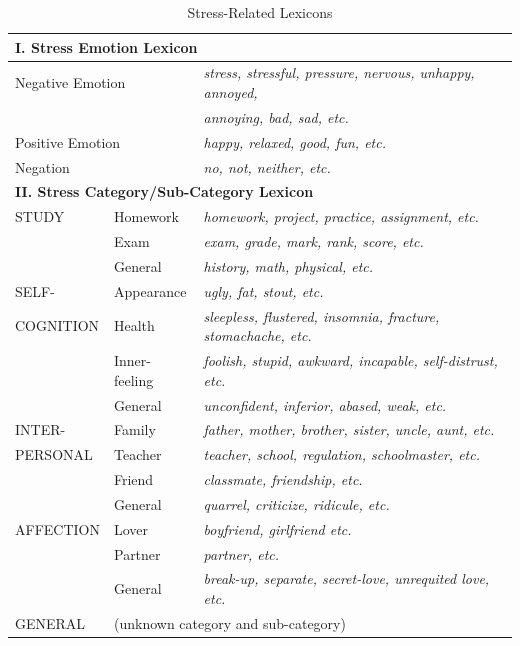 \begin{table}
\label{tab:lexicons}
\begin{minipage}{\textwidth}
\centering
\caption{Stress-Related Lexicons}

\begin{tabular}{ll|l} \\ \hline
\multicolumn{3}{l}{\textbf{I. Stress Emotion Lexicon}} \\ \hline
\multicolumn{2}{l|}{Negative Emotion} & \emph{stress, stressful, pressure,  nervous, unhappy, annoyed,} \\
  &      & \emph{annoying, bad, sad, etc.} \\ \hline
\multicolumn{2}{l|}{Positive Emotion} & \emph{happy, relaxed, good, fun, etc.} \\ \hline
\multicolumn{2}{l|}{Negation}  & \emph{no, not, neither, etc.} \\ \hline

\multicolumn{3}{l}{\textbf{II. Stress Category/Sub-Category Lexicon}} \\ \hline
STUDY & Homework & \emph{homework, project, practice, assignment, etc.} \\ \cline{2-3}
      & Exam     & \emph{exam, grade, mark, rank, score, etc.} \\ \cline{2-3}
      & General  & \emph{history, math, physical, etc.}  \\ \hline
SELF-      & Appearance & \emph{ugly, fat, stout, etc.} \\ \cline{2-3}
COGNITION      & Health     & \emph{sleepless, flustered, insomnia, fracture, stomachache, etc.} \\ \cline{2-3}
& Inner-feeling & \emph{foolish, stupid, awkward, incapable, self-distrust, etc.} \\ \cline{2-3}
               & General & \emph{unconfident, inferior, abased, weak, etc.} \\ \hline
INTER- & Family & \emph{father, mother, brother, sister, uncle, aunt, etc.} \\\cline{2-3}
PERSONAL & Teacher & \emph{teacher, school, regulation, schoolmaster, etc.} \\ \cline{2-3}
& Friend & \emph{classmate, friendship, etc.} \\ \cline{2-3}
& General & \emph{quarrel, criticize, ridicule, etc.} \\ \hline
AFFECTION & Lover  &  \emph{boyfriend, girlfriend etc.}  \\ \cline{2-3}
  & Partner    &  \emph{partner, etc.}    \\ \cline{2-3}
& General & \emph{break-up, separate, secret-love, unrequited love, etc.} \\ \hline
GENERAL & \multicolumn{2}{l}{(unknown category and sub-category)}   \\ \hline
\end{tabular}
\end{minipage}
\end{table}

